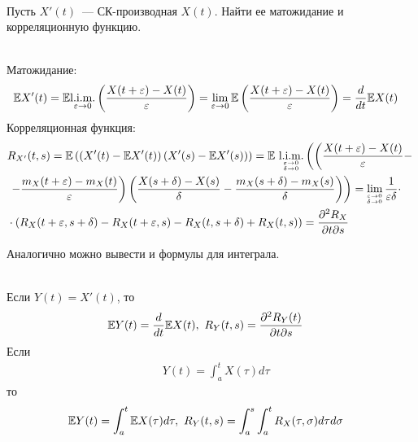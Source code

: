 \begin{problem}
    ~
    \\
    Пусть $X'(t)$~--- СК-производная $X(t)$. Найти ее матожидание и
    корреляционную функцию.
\end{problem}
\begin{solution}
    ~
    \\
    Матожидание:
    \begin{align*}
      & \mathbb{E} X'(t) = \mathbb{E} \underset{\varepsilon \to 0}{\text{l}.\text{i}.\text{m}.}\left( \frac{X(t+\varepsilon) - X(t)}{\varepsilon} \right) = \lim_{\varepsilon \to 0}\mathbb{E} \left( \frac{X(t+\varepsilon) - X(t)}{\varepsilon} \right) = \frac{d}{dt}\mathbb{E} X(t)
    \end{align*}
    Корреляционная функция:
    \begin{align*}
      & R_{X'}(t,s) = \EE \left( \left( X'(t) - \EE X'(t) \right)\left( X'(s) - \EE X'(s) \right) \right) = \EE \ \LIM{^{\varepsilon \to 0}_{\delta \to 0}}\left( \left( \frac{X(t+\varepsilon) - X(t)}{\varepsilon} - \right. \right. \\
      & \left. \left. - \frac{m_X(t+\varepsilon) - m_X(t)}{\varepsilon} \right)\left( \frac{X(s+\delta) - X(s)}{\delta} - \frac{m_X(s+\delta) - m_X(s)}{\delta} \right) \right) = \lim_{^{\varepsilon \to 0}_{\delta \to 0}} \frac{1}{\varepsilon \delta} \cdot \\
      & \cdot \left( R_X(t+\varepsilon, s+\delta) - R_X(t+\varepsilon, s) - R_X(t, s+\delta) + R_X(t, s)\right) = \frac{\partial^2 R_X}{\partial t \partial s}
    \end{align*}
\end{solution}
Аналогично можно вывести и формулы для интеграла.
\begin{Prop}
    ~
    \\
    Если $Y(t) = X'(t)$, то
    \begin{align*}
      & \mathbb{E} Y(t) = \frac{d}{dt} \mathbb{E} X(t), \ R_Y(t,s) = \frac{\partial^2 R_Y(t)}{\partial t \partial s}
    \end{align*}
    Если
    \begin{align*}
      & Y(t) = \int_a^t X(\tau) d\tau
    \end{align*}
    то
    \begin{align*}
      & \mathbb{E} Y(t) = \int_a^t \mathbb{E} X(\tau) d\tau, \ R_Y(t,s) = \int_a^s\int_a^t R_X(\tau, \sigma) d\tau d\sigma
    \end{align*}  
\end{Prop}

